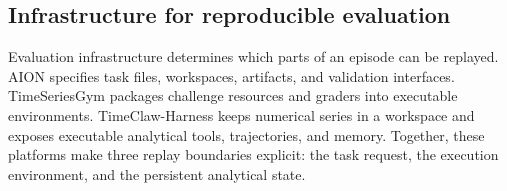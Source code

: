 \documentclass[preprints,article,submit,moreauthors]{Definitions/mdpi}
\begin{document}
\subsection{Infrastructure for reproducible evaluation}
\label{sec:eval-infrastructure}


Evaluation infrastructure determines which parts of an episode can be replayed. AION \citep{aion2026} specifies task files, workspaces, artifacts, and validation interfaces. TimeSeriesGym \citep{timeseriesgym2025} packages challenge resources and graders into executable environments. TimeClaw-Harness \citep{timeclaw2026harness} keeps numerical series in a workspace and exposes executable analytical tools, trajectories, and memory. Together, these platforms make three replay boundaries explicit: the task request, the execution environment, and the persistent analytical state.

\end{document}
